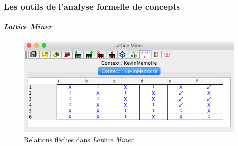 \documentclass[french]{beamer}
\newcommand{\lm}{\emph{Lattice Miner}\xspace}
\begin{document}
\begin{frame}
\frametitle{Les outils de l'analyse formelle de concepts}
\framesubtitle{\lm}
\begin{figure}[H]
\caption{Relations flèches dans \lm}
\label{cap:fig:lm-arrows}
\begin{center}\includegraphics[scale=0.45]{figures/lm-arrow.jpg}\end{center}
\end{figure}
\end{frame}

\end{document}

